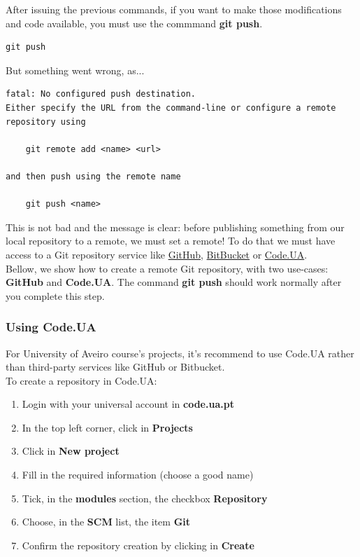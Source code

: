 \documentclass{article}
\begin{document}
After issuing the previous commands, if you want to make those modifications and code available, you must use the commmand \textbf{git push}.

\begin{lstlisting}
git push
\end{lstlisting}

But something went wrong, as...

\begin{lstlisting}
fatal: No configured push destination.
Either specify the URL from the command-line or configure a remote repository using

    git remote add <name> <url>

and then push using the remote name

    git push <name>

\end{lstlisting}

This is not bad and the message is clear: before publishing something from our local repository to a remote, we must set a remote! To do that we must have access to a Git repository service like \href{https://github.com}{GitHub}, \href{https://bitbucket.org}{BitBucket} or \href{http://code.ua.pt}{Code.UA}. \\

Bellow, we show how to create a remote Git repository, with two use-cases: \textbf{GitHub} and \textbf{Code.UA}. The command \textbf{git push} should work normally after you complete this step.


\subsubsection{Using Code.UA}

For University of Aveiro course's projects, it's recommend to use Code.UA rather than third-party services like GitHub or Bitbucket.\\

To create a repository in Code.UA:

\begin{enumerate}
\item Login with your universal account in\underline{} \textbf{code.ua.pt}
\item In the top left corner, click in \textbf{Projects}
\item Click in \textbf{New project}
\item Fill in the required information (choose a good name)
\item Tick, in the \textbf{modules} section, the checkbox \textbf{Repository}
\item Choose, in the \textbf{SCM} list, the item \textbf{Git}
\item Confirm the repository creation by clicking in \textbf{Create}
\end{enumerate}
\end{document}
